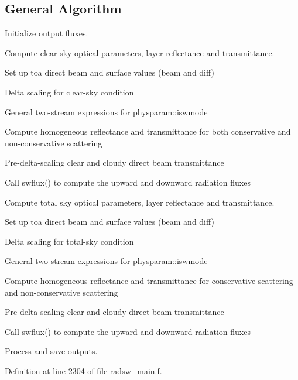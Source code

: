 \hypertarget{group__module__radsw__main_General_spcvrtc}{}\subsection{General Algorithm}\label{group__module__radsw__main_General_spcvrtc}

\begin{DoxyEnumerate}
\item Initialize output fluxes.
\item Compute clear-\/sky optical parameters, layer reflectance and transmittance.
\begin{DoxyItemize}
\item Set up toa direct beam and surface values (beam and diff)
\item Delta scaling for clear-\/sky condition
\item General two-\/stream expressions for physparam\+::iswmode
\item Compute homogeneous reflectance and transmittance for both conservative and non-\/conservative scattering
\item Pre-\/delta-\/scaling clear and cloudy direct beam transmittance
\item Call swflux() to compute the upward and downward radiation fluxes
\end{DoxyItemize}
\item Compute total sky optical parameters, layer reflectance and transmittance.
\begin{DoxyItemize}
\item Set up toa direct beam and surface values (beam and diff)
\item Delta scaling for total-\/sky condition
\item General two-\/stream expressions for physparam\+::iswmode
\item Compute homogeneous reflectance and transmittance for conservative scattering and non-\/conservative scattering
\item Pre-\/delta-\/scaling clear and cloudy direct beam transmittance
\item Call swflux() to compute the upward and downward radiation fluxes
\end{DoxyItemize}
\item Process and save outputs. 
\end{DoxyEnumerate}

Definition at line 2304 of file radsw\+\_\+main.\+f.



